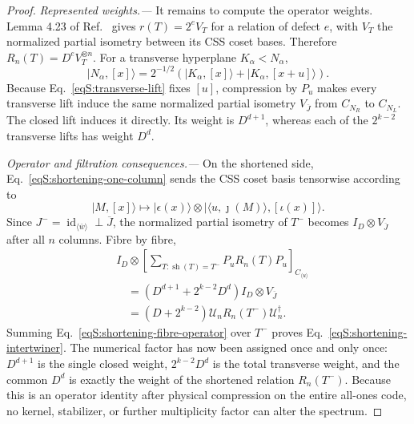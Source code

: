 \documentclass[journal,twocolumn]{IEEEtran}
\theoremstyle{definition}
\theoremstyle{plain}
\newcommand{\id}{\operatorname{id}}
\begin{document}
\begin{proof}
\smallskip\noindent\emph{Represented weights.---}
It remains to compute the operator weights.  Lemma 4.23 of
Ref.~\cite{GrossNezamiWalter2021} gives
$r(T)=2^eV_T$ for a relation of defect $e$, with $V_T$ the normalized
partial isometry between its CSS coset bases.  Therefore
$R_n(T)=D^eV_T^{\otimes n}$.  For a transverse hyperplane
$K_\alpha<N_\alpha$,
\begin{equation}
 |N_\alpha,[x]\rangle=2^{-1/2}
 (|K_\alpha,[x]\rangle+|K_\alpha,[x+u]\rangle).
 \label{eqS:coset-hyperplane}
\end{equation}
Because Eq.~\eqref{eqS:transverse-lift} fixes $[u]$, compression by $P_u$
makes every transverse lift induce the same normalized partial isometry
$V_{\overline J}$ from $C_{N_R}$ to $C_{N_L}$.  The closed lift induces it
directly.  Its weight is $D^{d+1}$, whereas each of the $2^{k-2}$
transverse lifts has weight $D^d$.

\smallskip\noindent\emph{Operator and filtration consequences.---}
On the shortened side, Eq.~\eqref{eqS:shortening-one-column} sends the CSS
coset basis tensorwise according to
\begin{equation}
 |M,[x]\rangle\longmapsto
 |\epsilon(x)\rangle\otimes
 |\langle u,\jmath(M)\rangle,[\iota(x)]\rangle.
 \label{eqS:shortening-coset-map}
\end{equation}
Since $J^-=\id_{\langle\bar w\rangle}\perp\overline J$, the normalized
partial isometry of $T^-$ becomes $I_D\otimes V_{\overline J}$ after all
$n$ columns.  Fibre by fibre,
\begin{equation}
 \begin{aligned}
 &I_D\otimes\!\left[\sum_{T:\operatorname{sh}(T)=T^-}
 P_uR_n(T)P_u\right]_{C_{\langle u\rangle}}\\
 &\quad=(D^{d+1}+2^{k-2}D^d)I_D\otimes V_{\overline J}\\
 &\quad=(D+2^{k-2})\mathcal U_nR_n(T^-)\mathcal U_n^\dagger.
 \end{aligned}
 \label{eqS:shortening-fibre-operator}
\end{equation}
Summing Eq.~\eqref{eqS:shortening-fibre-operator} over $T^-$ proves
Eq.~\eqref{eqS:shortening-intertwiner}.  The numerical factor has now been
assigned once and only once: $D^{d+1}$ is the single closed weight,
$2^{k-2}D^d$ is the total transverse weight, and the common $D^d$ is exactly
the weight of the shortened relation $R_n(T^-)$.  Because this is an operator
identity after physical compression on the entire all-ones code, no kernel,
stabilizer, or further multiplicity factor can alter the spectrum.


\end{proof}
\end{document}

